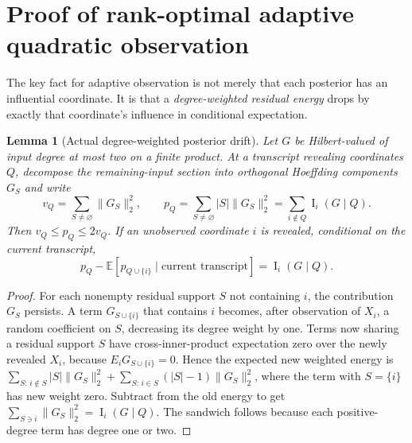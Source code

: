 \documentclass[11pt,letterpaper]{article}
\newtheorem{lemma}[theorem]{Lemma}
\theoremstyle{definition}
\newcommand{\E}{\mathbb E}
\newcommand{\Inf}{\operatorname{I}}
\newcommand{\norm}[1]{\lVert #1\rVert}
\begin{document}
\section{Proof of rank-optimal adaptive quadratic observation}\label{sec:policy}
The key fact for adaptive observation is not merely that each posterior has an influential coordinate. It is that a \emph{degree-weighted residual energy} drops by exactly that coordinate's influence in conditional expectation.

\begin{lemma}[Actual degree-weighted posterior drift]\label{lem:drift}
Let $G$ be Hilbert-valued of input degree at most two on a finite product. At a transcript revealing coordinates $Q$, decompose the remaining-input section into orthogonal Hoeffding components $G_S$ and write
\[
v_Q=\sum_{S\ne\varnothing}\norm{G_S}_2^2,\qquad
p_Q=\sum_{S\ne\varnothing}|S|\norm{G_S}_2^2=\sum_{i\notin Q}\Inf_i(G\mid Q).
\]
Then $v_Q\le p_Q\le2v_Q$. If an unobserved coordinate $i$ is revealed, conditional on the current transcript,
\begin{equation}\label{eq:drift}
p_Q-\E[p_{Q\cup\{i\}}\mid\text{current transcript}]=\Inf_i(G\mid Q).
\end{equation}
\end{lemma}
\begin{proof}
For each nonempty residual support $S$ not containing $i$, the contribution $G_S$ persists. A term $G_{S\cup\{i\}}$ that contains $i$ becomes, after observation of $X_i$, a random coefficient on $S$, decreasing its degree weight by one. Terms now sharing a residual support $S$ have cross-inner-product expectation zero over the newly revealed $X_i$, because $E_i G_{S\cup\{i\}}=0$. Hence the expected new weighted energy is
$\sum_{S:\,i\notin S}|S|\norm{G_S}_2^2 +\sum_{S:\,i\in S}(|S|-1)\norm{G_S}_2^2$,
where the term with $S=\{i\}$ has new weight zero. Subtract from the old energy to get $\sum_{S\ni i}\norm{G_S}_2^2=\Inf_i(G\mid Q)$. The sandwich follows because each positive-degree term has degree one or two.
\end{proof}
\end{document}
